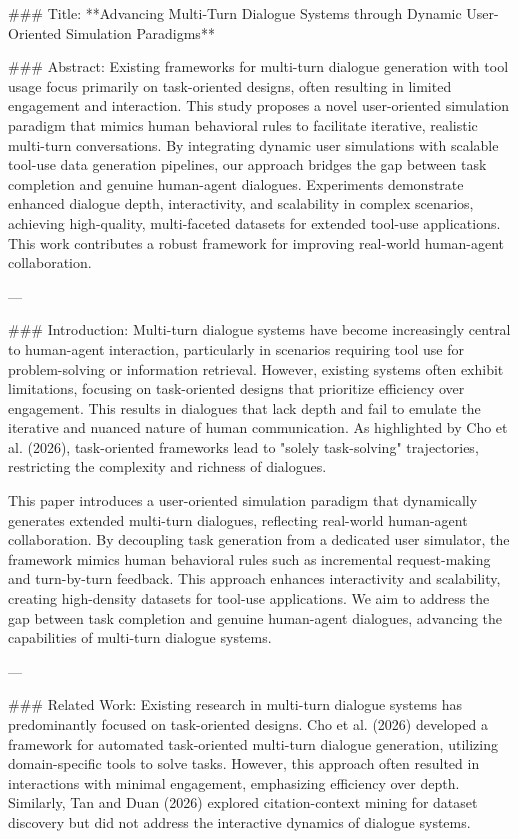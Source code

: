 ### Title:  
**Advancing Multi-Turn Dialogue Systems through Dynamic User-Oriented Simulation Paradigms**

### Abstract:  
Existing frameworks for multi-turn dialogue generation with tool usage focus primarily on task-oriented designs, often resulting in limited engagement and interaction. This study proposes a novel user-oriented simulation paradigm that mimics human behavioral rules to facilitate iterative, realistic multi-turn conversations. By integrating dynamic user simulations with scalable tool-use data generation pipelines, our approach bridges the gap between task completion and genuine human-agent dialogues. Experiments demonstrate enhanced dialogue depth, interactivity, and scalability in complex scenarios, achieving high-quality, multi-faceted datasets for extended tool-use applications. This work contributes a robust framework for improving real-world human-agent collaboration.

---

### Introduction:  
Multi-turn dialogue systems have become increasingly central to human-agent interaction, particularly in scenarios requiring tool use for problem-solving or information retrieval. However, existing systems often exhibit limitations, focusing on task-oriented designs that prioritize efficiency over engagement. This results in dialogues that lack depth and fail to emulate the iterative and nuanced nature of human communication. As highlighted by Cho et al. (2026), task-oriented frameworks lead to "solely task-solving" trajectories, restricting the complexity and richness of dialogues.

This paper introduces a user-oriented simulation paradigm that dynamically generates extended multi-turn dialogues, reflecting real-world human-agent collaboration. By decoupling task generation from a dedicated user simulator, the framework mimics human behavioral rules such as incremental request-making and turn-by-turn feedback. This approach enhances interactivity and scalability, creating high-density datasets for tool-use applications. We aim to address the gap between task completion and genuine human-agent dialogues, advancing the capabilities of multi-turn dialogue systems.

---

### Related Work:  
Existing research in multi-turn dialogue systems has predominantly focused on task-oriented designs. Cho et al. (2026) developed a framework for automated task-oriented multi-turn dialogue generation, utilizing domain-specific tools to solve tasks. However, this approach often resulted in interactions with minimal engagement, emphasizing efficiency over depth. Similarly, Tan and Duan (2026) explored citation-context mining for dataset discovery but did not address the interactive dynamics of dialogue systems.


